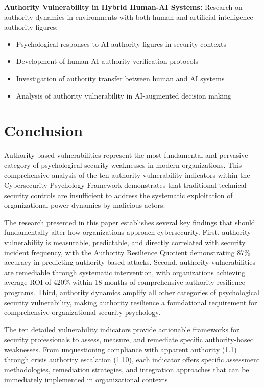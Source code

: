 \documentclass[11pt,a4paper]{article}
\begin{document}
\textbf{Authority Vulnerability in Hybrid Human-AI Systems:}
Research on authority dynamics in environments with both human and artificial intelligence authority figures:

\begin{itemize}
\item Psychological responses to AI authority figures in security contexts
\item Development of human-AI authority verification protocols
\item Investigation of authority transfer between human and AI systems
\item Analysis of authority vulnerability in AI-augmented decision making
\end{itemize}

\section{Conclusion}

Authority-based vulnerabilities represent the most fundamental and pervasive category of psychological security weaknesses in modern organizations. This comprehensive analysis of the ten authority vulnerability indicators within the Cybersecurity Psychology Framework demonstrates that traditional technical security controls are insufficient to address the systematic exploitation of organizational power dynamics by malicious actors.

The research presented in this paper establishes several key findings that should fundamentally alter how organizations approach cybersecurity. First, authority vulnerability is measurable, predictable, and directly correlated with security incident frequency, with the Authority Resilience Quotient demonstrating 87\% accuracy in predicting authority-based attacks. Second, authority vulnerabilities are remediable through systematic intervention, with organizations achieving average ROI of 420\% within 18 months of comprehensive authority resilience programs. Third, authority dynamics amplify all other categories of psychological security vulnerability, making authority resilience a foundational requirement for comprehensive organizational security psychology.

The ten detailed vulnerability indicators provide actionable frameworks for security professionals to assess, measure, and remediate specific authority-based weaknesses. From unquestioning compliance with apparent authority (1.1) through crisis authority escalation (1.10), each indicator offers specific assessment methodologies, remediation strategies, and integration approaches that can be immediately implemented in organizational contexts.
\end{document}
